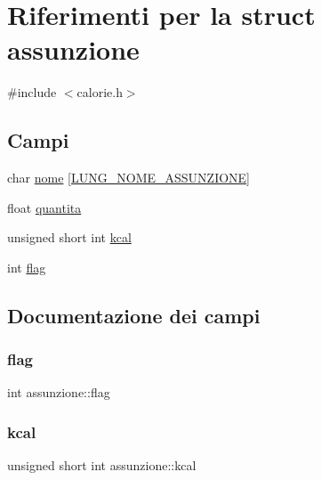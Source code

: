 \hypertarget{structassunzione}{}\section{Riferimenti per la struct assunzione}
\label{structassunzione}


{\ttfamily \#include $<$calorie.\+h$>$}

\subsection*{Campi}
\begin{DoxyCompactItemize}
\item 
char \hyperlink{structassunzione_aff7debc5c0b0bf1772b538eebc66c095}{nome} \mbox{[}\hyperlink{calorie_8h_a88b0ffe468e9084f35b1c67962e6627c}{L\+U\+N\+G\+\_\+\+N\+O\+M\+E\+\_\+\+A\+S\+S\+U\+N\+Z\+I\+O\+NE}\mbox{]}
\item 
float \hyperlink{structassunzione_ace2bbe92494045f3b34d4f2ef5c4e8db}{quantita}
\item 
unsigned short int \hyperlink{structassunzione_a56d39916ab5ac20d4e6833d604a7a247}{kcal}
\item 
int \hyperlink{structassunzione_a12cb3186967765ec4dc4d8883f98a35c}{flag}
\end{DoxyCompactItemize}


\subsection{Documentazione dei campi}
\mbox{\label{structassunzione_a12cb3186967765ec4dc4d8883f98a35c}} 
\subsubsection{\texorpdfstring{flag}{flag}}
{\footnotesize\ttfamily int assunzione\+::flag}

\mbox{\label{structassunzione_a56d39916ab5ac20d4e6833d604a7a247}} 
\subsubsection{\texorpdfstring{kcal}{kcal}}
{\footnotesize\ttfamily unsigned short int assunzione\+::kcal}


